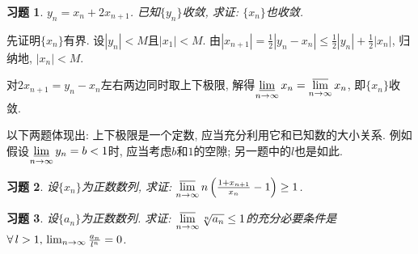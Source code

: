 \documentclass[11pt,a4paper]{ctexart}
\makeatletter
\theoremstyle{thmseries} %
\newtheorem{thm}{定理}[section]
\theoremstyle{exerseries}
\newtheorem{exer}{习题}[section]
\renewenvironment{proof}[1][\proofname]{\par
  \pushQED{\qed}%
  \normalfont \topsep6\p@\@plus6\p@\relax
  \trivlist
  \item[\hskip\labelsep
        \itshape
    #1\@addpunct{}]\ignorespaces
}{%
  \popQED\endtrivlist\@endpefalse
}
\newenvironment{pf}{\begin{proof}[\bfseries\upshape 证\quad]}{\end{proof}}
\newcommand{\bra}[1]{\mathopen{}\left(#1\right)}
\newcommand{\cbra}[1]{\mathopen{}\left\{#1\right\}}
\renewcommand{\epsilon}{\varepsilon}
\newcommand{\R}{\mathbb{R}}
\newcommand{\N}{\mathbb{N}}
\DeclareMathOperator{\llim}{\underset{\nti}{\underline{\lim}}}
\DeclareMathOperator{\ulim}{\underset{\nti}{\overline{\lim}}}
\def \nti {\mathnormal{n}\to\infty}
\makeatother
\begin{document}

\begin{exer}
	$y_n=x_n+2x_{n+1}$. 已知$\{y_n\}$收敛, 求证: $\{x_n\}$也收敛. 
\end{exer}
\begin{pf}
	先证明$\{x_n\}$有界. 设$|y_n|<M$且$|x_1|<M$. 由$|x_{n+1}|=\frac{1}{2}|y_n-x_n|\leq\frac{1}{2}|y_n|+\frac{1}{2}|x_n|$, 归纳地, $|x_n|<M$. 
	
	对$2x_{n+1}=y_n-x_n$左右两边同时取上下极限, 解得$\llim x_n=\ulim x_n$, 即$\{x_n\}$收敛. 
\end{pf}


以下两题体现出: 上下极限是一个定数, 应当充分利用它和已知数的大小关系. 例如假设$\llim y_n=b<1$时, 应当考虑$b$和$1$的空隙; 另一题中的$l$也是如此. 
\begin{exer}
	设$\{x_n\}$为正数数列, 求证: $\ulim n\,\bra{\frac{1+x_{n+1}}{x_n}-1}\geq1$. 
\end{exer}

\begin{exer}
	设$\{a_n\}$为正数数列. 求证: $\ulim \sqrt[n]{a_n}\leq1$的充分必要条件是$\forall\,l>1,\,\lim_{\nti}\frac{a_n}{l^n}=0$. 
\end{exer}
\end{document}
